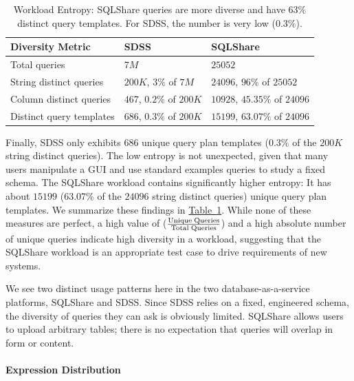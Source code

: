 \documentclass{sig-alternate}
\newcommand{\note}[2]{{\color{#1} {#2}}}
\newcommand{\reviewone}[1]{\note{black}{#1}}
\newcommand{\tabref}[1]{\hyperref[#1]{Table~\ref*{#1}}}
\newcommand{\sqlshare}{SQLShare}
\begin{document}
\begin{table}[h]
\centering
\begin{tabular}{| p{2.4cm} | p{2.4cm} | p{2.4cm} |}
\hline
Diversity Metric & SDSS & \sqlshare{} \\ \hline
Total queries & $7M$ & $25052$ \\ \hline
String distinct queries & $200K$, $3\%$ of $7M$ & $24096$, $96\%$ of $25052$ \\ \hline
Column distinct queries & $467$, $0.2\%$ of $200K$ & $10928$, $45.35\%$ of $24096$\\ \hline
Distinct query templates & $686$, $0.3\%$ of $200K$ & $15199$, $63.07\%$ of $24096$ \\ \hline
\end{tabular}
\vspace{-10pt}
\caption{\reviewone{Workload Entropy: \sqlshare{} queries are more diverse and have $63\%$ distinct query templates. For SDSS, the number is very low ($0.3\%$).}}
\label{t:entropy}
\end{table}

\reviewone{Finally, SDSS only exhibits $686$ unique query plan templates ($0.3\%$ of the $200K$ string distinct queries).
The low entropy is not unexpected, given that many users manipulate a GUI and use standard examples queries to study a fixed schema. 
The \sqlshare{} workload contains significantly higher entropy:
It has about $15199$ ($63.07\%$ of the $24096$ string distinct queries) unique query plan templates. 
We summarize these findings in \tabref{t:entropy}. While none of these measures are perfect, a high value of ($\frac{\rm Unique\;Queries}{\rm Total\;Queries}$) and a high absolute number of unique queries indicate high diversity in a workload, suggesting that the \sqlshare{} workload is an appropriate test case to drive requirements of new systems.
 
We see two distinct usage patterns here in the two database-as-a-service platforms, \sqlshare{} and SDSS. Since SDSS relies on a fixed, engineered schema, the diversity of queries they can ask is obviously limited.
\sqlshare{} allows users to upload arbitrary tables; there is no expectation that queries will overlap in form or content. 
}
\paragraph*{Expression Distribution}
\end{document}
